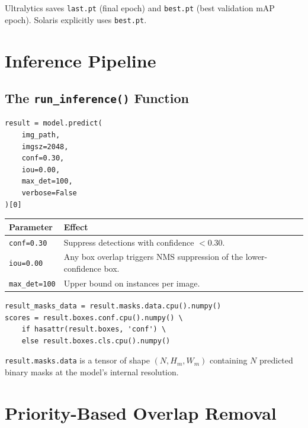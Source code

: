 \documentclass[11pt,a4paper,openany]{report}
\begin{document}
Ultralytics saves \texttt{last.pt} (final epoch) and \texttt{best.pt} (best validation mAP epoch).
Solaris explicitly uses \texttt{best.pt}.

\chapter{Inference Pipeline}

\section{The \texttt{run\_inference()} Function}

\begin{lstlisting}[caption={Prediction call},label={lst:predict}]
result = model.predict(
    img_path,
    imgsz=2048,
    conf=0.30,
    iou=0.00,
    max_det=100,
    verbose=False
)[0]
\end{lstlisting}

\begin{center}
\renewcommand{\arraystretch}{1.3}
\begin{tabular}{l p{9cm}}
\toprule
\textbf{Parameter} & \textbf{Effect} \\
\midrule
\texttt{conf=0.30} & Suppress detections with confidence $<0.30$. \\
\texttt{iou=0.00} & Any box overlap triggers NMS suppression of the lower-confidence box. \\
\texttt{max\_det=100} & Upper bound on instances per image. \\
\bottomrule
\end{tabular}
\end{center}

\begin{lstlisting}[caption={Extracting raw prediction tensors},label={lst:tensors}]
result_masks_data = result.masks.data.cpu().numpy()
scores = result.boxes.conf.cpu().numpy() \
    if hasattr(result.boxes, 'conf') \
    else result.boxes.cls.cpu().numpy()
\end{lstlisting}

\texttt{result.masks.data} is a tensor of shape $(N, H_m, W_m)$ containing $N$ predicted binary
masks at the model's internal resolution.

\chapter{Priority-Based Overlap Removal}
\end{document}
